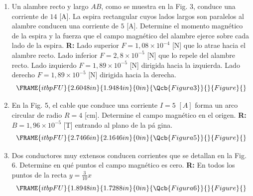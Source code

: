 \documentclass[12pt]{article}
\begin{document}
\begin{enumerate}
\item Un alambre recto y largo $AB$, como se muestra en la Fig. 3, conduce
una corriente de $14$ [A]. La espira rectangular cuyos lados largos son
paralelos al alambre conducen una corriente de $5$ [A]. Determine el momento
magn\'{e}tico de la espira y la fuerza que el campo magn\'{e}tico del
alambre ejerce sobre cada lado de la espira. \textbf{R: }Lado superior $%
F=1,08\times 10^{-4}$ [N] que lo atrae hacia el alambre recto. Lado inferior 
$F=2,8\times 10^{-5}$ [N] que lo repele del alambre recto. Lado izquierdo $%
F=1,89\times 10^{-5}$ [N] dirigida hacia la izquierda. Lado derecho $%
F=1,89\times 10^{-5}$ [N] dirigida hacia la derecha. 
\begin{equation*}
\FRAME{itbpFU}{2.6048in}{1.9484in}{0in}{\Qcb{Figura 3}}{}{Figure}{\special%
{language "Scientific Word";type "GRAPHIC";maintain-aspect-ratio
TRUE;display "USEDEF";valid_file "T";width 2.6048in;height 1.9484in;depth
0in;original-width 4.3734in;original-height 3.2629in;cropleft "0";croptop
"1";cropright "1";cropbottom "0";tempfilename
'R3IG7X03.wmf';tempfile-properties "XPR";}}
\end{equation*}

\item En la Fig. 5, el cable que conduce una corriente $I=5$ $[A]$ forma un
arco circular de radio $R=4$ [cm]$.$ Determine el campo magn\'{e}tico en el
origen. \textbf{R: }$B=1,96\times 10^{-5}$ [T] entrando al plano de la p\'{a}%
gina.%
\begin{equation*}
\FRAME{itbpFU}{2.7466in}{2.1646in}{0in}{\Qcb{Figura 5}}{}{Figure}{\special%
{language "Scientific Word";type "GRAPHIC";maintain-aspect-ratio
TRUE;display "USEDEF";valid_file "T";width 2.7466in;height 2.1646in;depth
0in;original-width 3.8311in;original-height 3.013in;cropleft "0";croptop
"1";cropright "1";cropbottom "0";tempfilename
'R3IG7X05.wmf';tempfile-properties "XPR";}}
\end{equation*}%
\pagebreak

\item Dos conductores muy extensos conducen corrientes que se detallan en la
Fig. 6. Determine en qu\'{e} puntos el campo magn\'{e}tico es cero. \textbf{%
R:} En todos los puntos de la recta $y=\frac{3}{10}x$%
\begin{equation*}
\FRAME{itbpFU}{1.8948in}{1.7288in}{0in}{\Qcb{Figura 6}}{}{Figure}{\special%
{language "Scientific Word";type "GRAPHIC";maintain-aspect-ratio
TRUE;display "USEDEF";valid_file "T";width 1.8948in;height 1.7288in;depth
0in;original-width 3.1202in;original-height 2.8461in;cropleft "0";croptop
"1";cropright "1";cropbottom "0";tempfilename
'R3IG7X06.wmf';tempfile-properties "XPR";}}
\end{equation*}


\end{enumerate}
\end{document}
